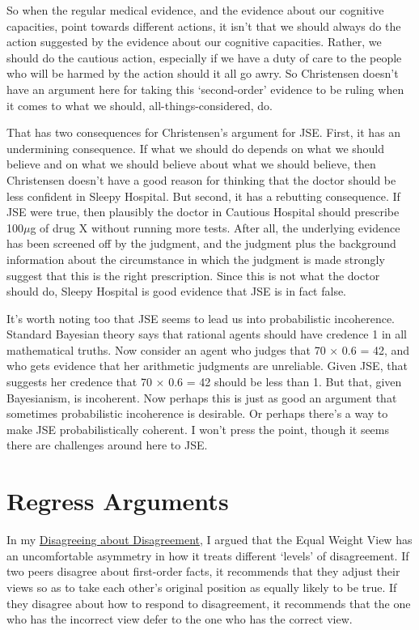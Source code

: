 \documentclass[
  10pt,
  letterpaper,
  DIV=11,
  numbers=noendperiod,
  twoside]{scrartcl}
\begin{document}
So when the regular medical evidence, and the evidence about our
cognitive capacities, point towards different actions, it isn't that we
should always do the action suggested by the evidence about our
cognitive capacities. Rather, we should do the cautious action,
especially if we have a duty of care to the people who will be harmed by
the action should it all go awry. So Christensen doesn't have an
argument here for taking this `second-order' evidence to be ruling when
it comes to what we should, all-things-considered, do.

That has two consequences for Christensen's argument for JSE. First, it
has an undermining consequence. If what we should do depends on what we
should believe and on what we should believe about what we should
believe, then Christensen doesn't have a good reason for thinking that
the doctor should be less confident in Sleepy Hospital. But second, it
has a rebutting consequence. If JSE were true, then plausibly the doctor
in Cautious Hospital should prescribe 100\(\mu\)g of drug X without
running more tests. After all, the underlying evidence has been screened
off by the judgment, and the judgment plus the background information
about the circumstance in which the judgment is made strongly suggest
that this is the right prescription. Since this is not what the doctor
should do, Sleepy Hospital is good evidence that JSE is in fact false.

It's worth noting too that JSE seems to lead us into probabilistic
incoherence. Standard Bayesian theory says that rational agents should
have credence 1 in all mathematical truths. Now consider an agent who
judges that 70 × 0.6 = 42, and who gets evidence that her arithmetic
judgments are unreliable. Given JSE, that suggests her credence that 70
× 0.6 = 42 should be less than 1. But that, given Bayesianism, is
incoherent. Now perhaps this is just as good an argument that sometimes
probabilistic incoherence is desirable. Or perhaps there's a way to make
JSE probabilistically coherent. I won't press the point, though it seems
there are challenges around here to JSE.

\section{Regress Arguments}\label{regress-arguments}

In my \href{http://brian.weatherson.org/DaD.pdf}{Disagreeing about
Disagreement}, I argued that the Equal Weight View has an uncomfortable
asymmetry in how it treats different `levels' of disagreement. If two
peers disagree about first-order facts, it recommends that they adjust
their views so as to take each other's original position as equally
likely to be true. If they disagree about how to respond to
disagreement, it recommends that the one who has the incorrect view
defer to the one who has the correct view.
\end{document}
